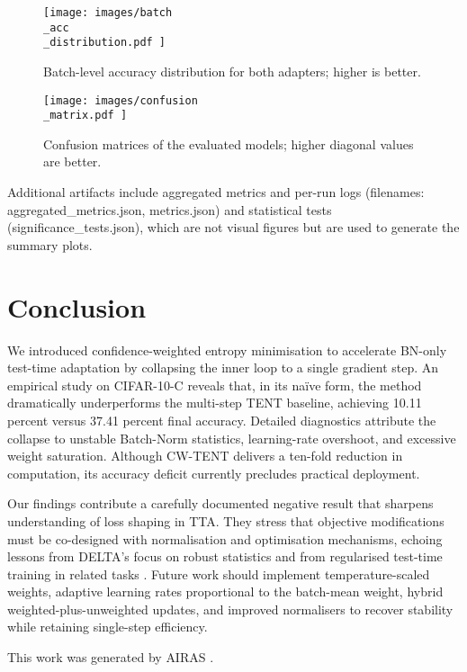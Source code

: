 \documentclass{article} %
\begin{document}
\begin{figure}[H]
\centering
\texttt{[image:  images/batch\\\_acc\\\_distribution.pdf ]}
\caption{Batch-level accuracy distribution for both adapters; higher is better.}
\end{figure}

\begin{figure}[H]
\centering
\texttt{[image:  images/confusion\\\_matrix.pdf ]}
\caption{Confusion matrices of the evaluated models; higher diagonal values are better.}
\end{figure}

Additional artifacts include aggregated metrics and per-run logs (filenames: aggregated\_metrics.json, metrics.json) and statistical tests (significance\_tests.json), which are not visual figures but are used to generate the summary plots.

\section{Conclusion}
\label{sec:conclusion}
We introduced confidence-weighted entropy minimisation to accelerate BN-only test-time adaptation by collapsing the inner loop to a single gradient step. An empirical study on CIFAR-10-C reveals that, in its naïve form, the method dramatically underperforms the multi-step TENT baseline, achieving 10.11 percent versus 37.41 percent final accuracy. Detailed diagnostics attribute the collapse to unstable Batch-Norm statistics, learning-rate overshoot, and excessive weight saturation. Although CW-TENT delivers a ten-fold reduction in computation, its accuracy deficit currently precludes practical deployment.

Our findings contribute a carefully documented negative result that sharpens understanding of loss shaping in TTA. They stress that objective modifications must be co-designed with normalisation and optimisation mechanisms, echoing lessons from DELTA’s focus on robust statistics \cite{zhao-2023-delta} and from regularised test-time training in related tasks \cite{author-year-test}. Future work should implement temperature-scaled weights, adaptive learning rates proportional to the batch-mean weight, hybrid weighted-plus-unweighted updates, and improved normalisers to recover stability while retaining single-step efficiency.

This work was generated by \textsc{AIRAS} \citep{airas2025}.



\end{document}
